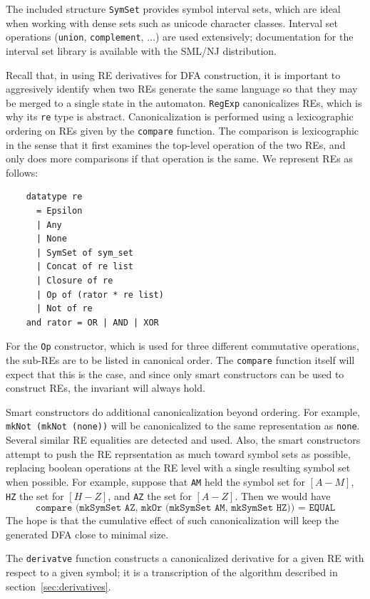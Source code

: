 \documentclass[11pt]{article}
\newcommand{\nm}[1]{\texttt{#1}}
\begin{document}
The included structure \nm{SymSet} provides symbol interval sets, which are
ideal when working with dense sets such as unicode character classes.  Interval
set operations (\nm{union}, \nm{complement}, $\dots$) are used extensively;
documentation for the interval set library is available with the SML/NJ
distribution.

Recall that, in using RE derivatives for DFA construction, it is
important to aggresively identify when two REs generate the same
language so that they may be merged to a single state in the automaton.
\nm{RegExp} canonicalizes REs, which is why its \nm{re} type is abstract.
Canonicalization is performed using a lexicographic ordering on REs given by the
\nm{compare} function.  The comparison is lexicographic in the sense that it
first examines the top-level operation of the two REs, and only does more
comparisons if that operation is the same.  We represent REs as follows:
\begin{verbatim}
    datatype re
      = Epsilon
      | Any
      | None
      | SymSet of sym_set
      | Concat of re list
      | Closure of re
      | Op of (rator * re list)
      | Not of re
    and rator = OR | AND | XOR
\end{verbatim}
For the \nm{Op} constructor, which is used for three different commutative
operations, the sub-REs are to be listed in canonical order. The \nm{compare}
function itself will expect that this is the case, and since only smart
constructors can be used to construct REs, the invariant will always hold.

Smart constructors do additional canonicalization beyond ordering.  For
example, \nm{mkNot (mkNot (none))} will be canonicalized
to the same representation as \nm{none}.  Several similar RE equalities
are detected and used.  Also, the smart constructors attempt to push the RE
reprsentation as much toward symbol sets as possible, replacing boolean
operations at the RE level with a single resulting symbol set when possible.
For example, suppose that \nm{AM} held the symbol set for $[A-M]$, \nm{HZ} the
set for $[H-Z]$, and \nm{AZ} the set for $[A-Z]$. Then we would have
\[
\texttt{compare (mkSymSet AZ, mkOr (mkSymSet AM, mkSymSet HZ)) = EQUAL}
\]
The hope is that the cumulative effect of such canonicalization will keep the
generated DFA close to minimal size.

The \nm{derivatve} function constructs a canonicalized derivative for a given
RE with respect to a given symbol; it is a transcription of the algorithm
described in section~\ref{sec:derivatives}.
\end{document}
